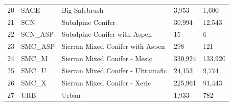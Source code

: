 \begin{table}[!htbp]
\begin{tabular}{@{}lllll@{}}
20                                                          & SAGE                                                               & Big Safebrush                                & 3,953                                                   & 1,600                                                      \\
\rowcolor[HTML]{CAD6BA} 
21                                                          & SCN                                                                & Subalpine Conifer                            & 30,994                                                  & 12,543                                                     \\
22                                                          & SCN\_ASP                                                           & Subalpine Conifer with Aspen                 & 15                                                      & 6                                                          \\
\rowcolor[HTML]{CAD6BA} 
23                                                          & SMC\_ASP                                                           & Sierran Mixed Conifer with Aspen             & 298                                                     & 121                                                        \\
24                                                          & SMC\_M                                                             & Sierran Mixed Conifer - Mesic                & 330,924                                                 & 133,920                                                    \\
\rowcolor[HTML]{CAD6BA} 
25                                                          & SMC\_U                                                             & Sierran Mixed Conifer - Ultramafic           & 24,153                                                  & 9,774                                                      \\
26                                                          & SMC\_X                                                             & Sierran Mixed Conifer - Xeric                & 225,961                                                 & 91,443                                                     \\
\rowcolor[HTML]{CAD6BA} 
27                                                          & URB                                                                & Urban                                        & 1,933                                                   & 782                                                        \\

\end{tabular}
\end{table}
